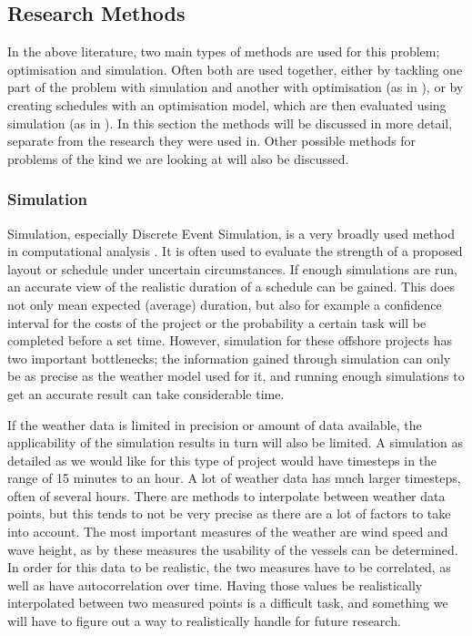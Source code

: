 \documentclass[a4paper,12pt]{article}
\begin{document}

\subsection{Research Methods} \label{ss:meth}
In the above literature, two main types of methods are used for this problem; optimisation and simulation. Often both are used together, either by tackling one part of the problem with simulation and another with optimisation (as in \cite{barlow2018mixed}), or by creating schedules with an optimisation model, which are then evaluated using simulation (as in \cite{kerkhove2017optimised}). In this section the methods will be discussed in more detail, separate from the research they were used in. Other possible methods for problems of the kind we are looking at will also be discussed. 

\bigskip

\subsubsection{Simulation} \label{sss:sim}
Simulation, especially Discrete Event Simulation, is a very broadly used method in computational analysis \cite{law2000simulation,robinson2010conceptual}. It is often used to evaluate the strength of a proposed layout or schedule under uncertain circumstances. If enough simulations are run, an accurate view of the realistic duration of a schedule can be gained. This does not only mean expected (average) duration, but also for example a confidence interval for the costs of the project or the probability a certain task will be completed before a set time. However, simulation for these offshore projects has two important bottlenecks; the information gained through simulation can only be as precise as the weather model used for it, and running enough simulations to get an accurate result can take considerable time. 

\bigskip

If the weather data is limited in precision or amount of data available, the applicability of the simulation results in turn will also be limited. A simulation as detailed as we would like for this type of project would have timesteps in the range of 15 minutes to an hour. A lot of weather data has much larger timesteps, often of several hours. There are methods to interpolate between weather data points, but this tends to not be very precise as there are a lot of factors to take into account. The most important measures of the weather are wind speed and wave height, as by these measures the usability of the vessels can be determined. In order for this data to be realistic, the two measures have to be correlated, as well as have autocorrelation over time. Having those values be realistically interpolated between two measured points is a difficult task, and something we will have to figure out a way to realistically handle for future research.
\end{document}
